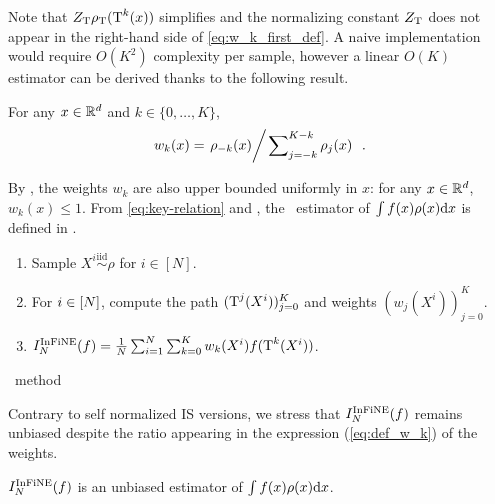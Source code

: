 \documentclass{article}
\begin{document}
Note that $Z_{\operatorname{T}}\rho_{\operatorname{T}}(\operatorname{T}^{k}(x))$ simplifies and the
normalizing constant $Z_{\operatorname{T}}$ does not appear in the right-hand
side of \eqref{eq:w_k_first_def}. A naive implementation would require $O(K^2)$ complexity per sample, however a linear $O(K)$ estimator can be derived thanks to the following result.
\begin{lemma}
\label{SPlemma:weights}
For any $x \in \mathbb{R}^d$ and $k \in\{0, \dots, K\}$,
\begin{equation}
  \label{eq:def_w_k}
    w_{k}(x) =  \left.  \rho_{-k}(x) \middle / \left. \sum\nolimits_{j=-k}^{K-k} \rho_{j}(x) \right. \right. \;.
\end{equation}
\end{lemma}
By , the weights $w_{k}$ are also upper bounded uniformly in $x$: for any $x \in \mathbb{R}^d$,  $w_{k}(x) \leq 1$. From \eqref{eq:key-relation} and , the \IFIS\ estimator of $\int f(x) \rho(x) \mathrm{d} x$ is defined in .
\begin{algorithm}
\begin{enumerate}[wide, labelwidth=!, labelindent=0pt, label=(\arabic*)]
\item Sample $X^i \overset{\text{iid}}{\sim} \rho$ for $i\in[N]$.
\item For $i \in [N]$, compute the
  path $(\operatorname{T}^j(X^i))_{j =0}^K$ and weights $(w_j(X^i))_{j =0}^K$.
\item$I^{\operatorname{InFiNE}}_N(f) =   \tfrac{1}{N} \sum_{i=1}^N \sum_{k=0}^K w_k(X^i)  f(\operatorname{T}^k(X^i))$.
\end{enumerate}
\caption{\IFIS\ method}
\label{algo:IFIS}
\end{algorithm}
Contrary to self normalized IS versions, we stress that $I^{\operatorname{InFiNE}}_N(f)$ remains unbiased despite the ratio appearing in the expression  (\ref{eq:def_w_k}) of the weights.
\begin{theorem}
\label{theo:importance-sampling}
$I^{\operatorname{InFiNE}}_N(f)$ is an unbiased estimator of $\int f(x) \rho(x) \mathrm{d} x$.
\end{theorem}
\end{document}
